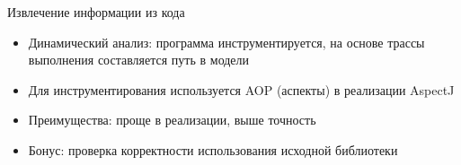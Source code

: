 \documentclass[12pt]{beamer}
\begin{document}
{
\begin{frame}[fragile]{Извлечение информации из кода}
	\begin{mybox}[]
		\begin{itemize}
			\item Динамический анализ: программа инструментируется, на основе трассы выполнения составляется путь в модели
			\item Для инструментирования используется AOP (аспекты) в реализации AspectJ
			\item Преимущества: проще в реализации, выше точность
			\item Бонус: проверка корректности использования исходной библиотеки
		\end{itemize}
	\end{mybox}
\end{frame}
}
\end{document}
